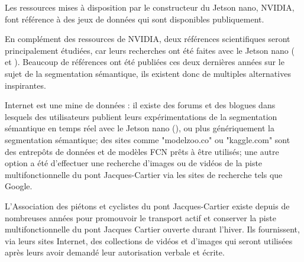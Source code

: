 ﻿\label{metho:data}


\par Les ressources mises à disposition par le constructeur du Jetson nano, NVIDIA, font référence à des jeux de données qui sont disponibles publiquement.
\par En complément des ressources de NVIDIA, deux références scientifiques seront principalement étudiées, car leurs recherches ont été faites avec le Jetson nano (\cite{nguyen_mavnet_2019} et \cite{chong_real-time_1992}). Beaucoup de références ont été publiées ces deux dernières années sur le sujet de la segmentation sémantique, ils existent donc de multiples alternatives inspirantes.
\par Internet est une mine de données : il existe des forums et des blogues dans lesquels des utilisateurs publient leurs expérimentations de la segmentation sémantique en temps réel avec le Jetson nano (\cite{dustin_realtime_2019}), ou plus génériquement la segmentation sémantique; des sites comme "modelzoo.co" ou "kaggle.com" sont des entrepôts de données et de modèles FCN prêts à être utilisés; une autre option a été d'effectuer une recherche d'images ou de vidéos de la piste multifonctionnelle du pont Jacques-Cartier via les sites de recherche tels que Google. 
\par L'Association des piétons et cyclistes du pont Jacques-Cartier existe depuis de nombreuses années pour promouvoir le transport actif et conserver la piste multifonctionnelle du pont Jacques Cartier ouverte durant l'hiver. Ils fournissent, via leurs sites Internet, des collections de vidéos et d'images qui seront utilisées après leurs avoir demandé leur autorisation verbale et écrite. \cite{association_des_pietons_et_cyclistes_du_pont_jacques-cartier_pontjacques-cartier365com_2020} \cite{association_des_pietons_et_cyclistes_pont_jacques-cartier_flickr_2020}


